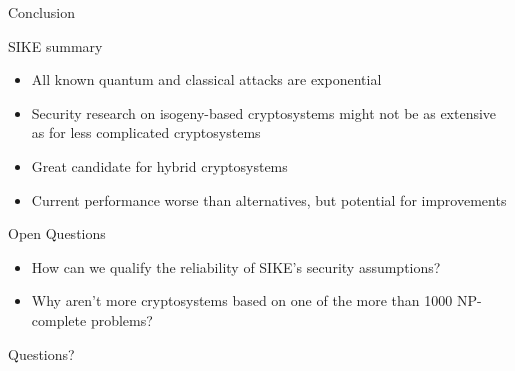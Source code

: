 \documentclass[handout]{beamer}
\begin{document}
\begin{frame}{Conclusion}

SIKE summary
\begin{itemize}[\textbullet]
	
	\item All known quantum and classical attacks are exponential\pause
	\item Security research on isogeny-based cryptosystems might not be as extensive as for less complicated cryptosystems\pause
	\item Great candidate for hybrid cryptosystems\pause
	\item Current performance worse than alternatives, but potential for improvements\pause
\end{itemize}
\vfill
Open Questions
\begin{itemize}[\textbullet]
	\item How can we qualify the reliability of SIKE's security assumptions?\pause
	\item Why aren't more cryptosystems based on one of the more than 1000 NP-complete problems? 
\end{itemize}
\end{frame}

\begin{frame}{Questions?}

\end{frame}
\end{document}
